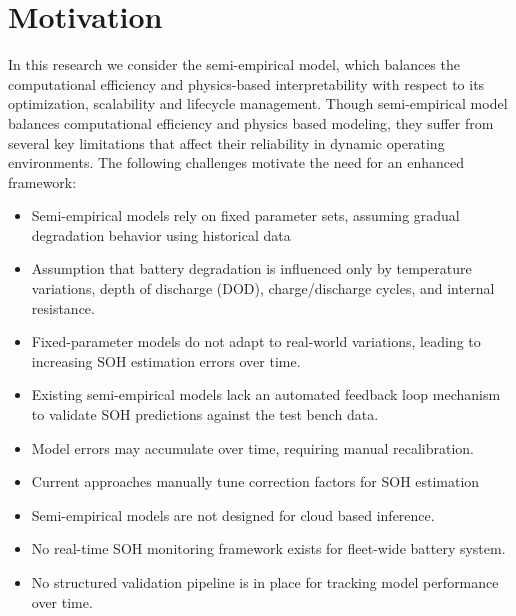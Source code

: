 \section{Motivation}
In this research we consider the semi-empirical model, which balances the computational efficiency and physics-based interpretability with respect to its optimization, scalability and lifecycle management. Though semi-empirical model balances computational efficiency and physics based modeling, they suffer from several key limitations that affect their reliability in dynamic operating environments. The following challenges motivate the need for an enhanced framework:
\begin{itemize}
    \item Semi-empirical models rely on fixed parameter sets, assuming gradual degradation behavior using historical data
    \item Assumption that battery degradation is influenced only by temperature variations, depth of discharge (DOD), charge/discharge cycles, and internal resistance.
    \item Fixed-parameter models do not adapt to real-world variations, leading to increasing SOH estimation errors over time.
    \item Existing semi-empirical models lack an automated feedback loop mechanism to validate SOH predictions against the test bench data.
    \item Model errors may accumulate over time, requiring manual recalibration.
    \item Current approaches manually tune correction factors for SOH estimation
    \item Semi-empirical models are not designed for cloud based inference.
    \item No real-time SOH monitoring framework exists for fleet-wide battery system.
    \item No structured validation pipeline is in place for tracking model performance over time.
\end{itemize}

